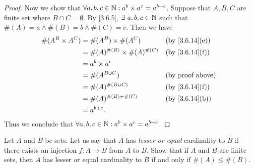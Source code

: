 \begin{proof}
  Now we show that \(\forall a, b, c \in \mathbb{N} : a^b \times a^c = a^{b + c}\).
  Suppose that \(A, B, C\) are finite set where \(B \cap C = \emptyset\).
  By \cref{3.6.5}, \(\exists\ a, b, c \in \N\) such that \(\#(A) = a \land \#(B) = b \land \#(C) = c\).
  Then we have
  \begin{align*}
    \#(A^B \times A^C) & = \#(A^B) \times \#(A^C)             &  & \text{(by \cref{3.6.14}(e))} \\
                       & = \#(A)^{\#(B)} \times \#(A)^{\#(C)} &  & \text{(by \cref{3.6.14}(f))} \\
                       & = a^b \times a^c                                                       \\
                       & = \#(A^{B \cup C})                   &  & \text{(by proof above)}      \\
                       & = \#(A)^{\#(B \cup C)}               &  & \text{(by \cref{3.6.14}(f))} \\
                       & = \#(A)^{\#(B) + \#(C)}              &  & \text{(by \cref{3.6.14}(b))} \\
                       & = a^{b + c}.
  \end{align*}
  Thus we conclude that \(\forall a, b, c \in \mathbb{N} : a^b \times a^c = a^{b + c}\).
\end{proof}

\begin{ex}\label{ex:3.6.7}
  Let \(A\) and \(B\) be sets.
  Let us say that \(A\) has \emph{lesser or equal} cardinality to \(B\) if there exists an injection \(f : A \to B\) from \(A\) to \(B\).
  Show that if \(A\) and \(B\) are finite sets, then \(A\) has lesser or equal cardinality to \(B\) if and only if \(\#(A) \leq \#(B)\).
\end{ex}

